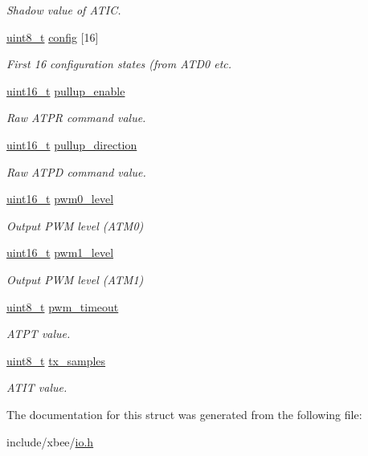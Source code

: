 \begin{DoxyCompactItemize}
\begin{DoxyCompactList}\small\item\em Shadow value of A\+T\+IC. \end{DoxyCompactList}\item 
\hyperlink{group__hal__dos_gae1affc9ca37cfb624959c866a73f83c2}{uint8\+\_\+t} \hyperlink{group__xbee__io_ga46d8dea1f8c2a731faf0db27d6ed308f}{config} \mbox{[}16\mbox{]}
\begin{DoxyCompactList}\small\item\em First 16 configuration states (from A\+T\+D0 etc. \end{DoxyCompactList}\item 
\hyperlink{group__hal__dos_ga5a8b2dc9e45a9ee81a94ef304fb62505}{uint16\+\_\+t} \hyperlink{group__xbee__io_ga059172dae4cbb97d22755682ec824079}{pullup\+\_\+enable}
\begin{DoxyCompactList}\small\item\em Raw A\+T\+PR command value. \end{DoxyCompactList}\item 
\hyperlink{group__hal__dos_ga5a8b2dc9e45a9ee81a94ef304fb62505}{uint16\+\_\+t} \hyperlink{group__xbee__io_gaa1b20f291d5ad3201dbf1d3ff9aae9f2}{pullup\+\_\+direction}
\begin{DoxyCompactList}\small\item\em Raw A\+T\+PD command value. \end{DoxyCompactList}\item 
\hyperlink{group__hal__dos_ga5a8b2dc9e45a9ee81a94ef304fb62505}{uint16\+\_\+t} \hyperlink{group__xbee__io_gac20a5cb3031dfc972e4a7fcb21e7face}{pwm0\+\_\+level}
\begin{DoxyCompactList}\small\item\em Output P\+WM level (A\+T\+M0) \end{DoxyCompactList}\item 
\hyperlink{group__hal__dos_ga5a8b2dc9e45a9ee81a94ef304fb62505}{uint16\+\_\+t} \hyperlink{group__xbee__io_gaeb45f3abc59a12070b903f6b832b9de5}{pwm1\+\_\+level}
\begin{DoxyCompactList}\small\item\em Output P\+WM level (A\+T\+M1) \end{DoxyCompactList}\item 
\hyperlink{group__hal__dos_gae1affc9ca37cfb624959c866a73f83c2}{uint8\+\_\+t} \hyperlink{group__xbee__io_ga2c9a187c0282faada2a305e02f9ac0e0}{pwm\+\_\+timeout}
\begin{DoxyCompactList}\small\item\em A\+T\+PT value. \end{DoxyCompactList}\item 
\hyperlink{group__hal__dos_gae1affc9ca37cfb624959c866a73f83c2}{uint8\+\_\+t} \hyperlink{group__xbee__io_ga7483aa3631522522a66c78b0f7f946f7}{tx\+\_\+samples}
\begin{DoxyCompactList}\small\item\em A\+T\+IT value. \end{DoxyCompactList}\end{DoxyCompactItemize}


The documentation for this struct was generated from the following file\+:\begin{DoxyCompactItemize}
\item 
include/xbee/\hyperlink{io_8h}{io.\+h}\end{DoxyCompactItemize}
